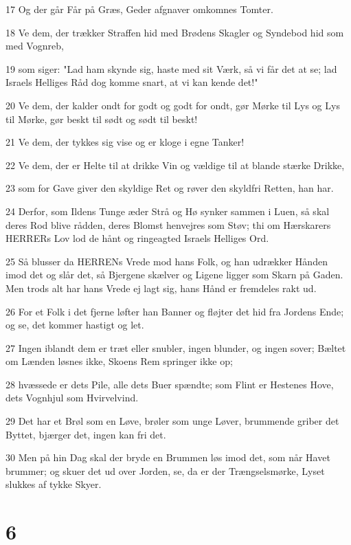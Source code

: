 \par 17 Og der går Får på Græs, Geder afgnaver omkomnes Tomter.
\par 18 Ve dem, der trækker Straffen hid med Brødens Skagler og Syndebod hid som med Vognreb,
\par 19 som siger: "Lad ham skynde sig, haste med sit Værk, så vi får det at se; lad Israels Helliges Råd dog komme snart, at vi kan kende det!"
\par 20 Ve dem, der kalder ondt for godt og godt for ondt, gør Mørke til Lys og Lys til Mørke, gør beskt til sødt og sødt til beskt!
\par 21 Ve dem, der tykkes sig vise og er kloge i egne Tanker!
\par 22 Ve dem, der er Helte til at drikke Vin og vældige til at blande stærke Drikke,
\par 23 som for Gave giver den skyldige Ret og røver den skyldfri Retten, han har.
\par 24 Derfor, som Ildens Tunge æder Strå og Hø synker sammen i Luen, så skal deres Rod blive rådden, deres Blomst henvejres som Støv; thi om Hærskarers HERRERs Lov lod de hånt og ringeagted Israels Helliges Ord.
\par 25 Så blusser da HERRENs Vrede mod hans Folk, og han udrækker Hånden imod det og slår det, så Bjergene skælver og Ligene ligger som Skarn på Gaden. Men trods alt har hans Vrede ej lagt sig, hans Hånd er fremdeles rakt ud.
\par 26 For et Folk i det fjerne løfter han Banner og fløjter det hid fra Jordens Ende; og se, det kommer hastigt og let.
\par 27 Ingen iblandt dem er træt eller snubler, ingen blunder, og ingen sover; Bæltet om Lænden løsnes ikke, Skoens Rem springer ikke op;
\par 28 hvæssede er dets Pile, alle dets Buer spændte; som Flint er Hestenes Hove, dets Vognhjul som Hvirvelvind.
\par 29 Det har et Brøl som en Løve, brøler som unge Løver, brummende griber det Byttet, bjærger det, ingen kan fri det.
\par 30 Men på hin Dag skal der bryde en Brummen løs imod det, som når Havet brummer; og skuer det ud over Jorden, se, da er der Trængselsmørke, Lyset slukkes af tykke Skyer.

\chapter{6}

